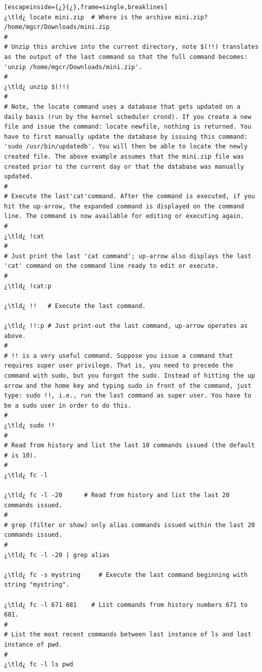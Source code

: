 \begin{lstlisting}[escapeinside={¿}{¿},frame=single,breaklines]
¿\tld¿ locate mini.zip	# Where is the archive mini.zip?
/home/mgcr/Downloads/mini.zip
#
# Unzip this archive into the current directory, note $(!!) translates as the output of the last command so that the full command becomes: 'unzip /home/mgcr/Downloads/mini.zip'.
#
¿\tld¿ unzip $(!!)	
#
# Note, the locate command uses a database that gets updated on a daily basis (run by the kernel scheduler crond). If you create a new file and issue the command: locate newfile, nothing is returned. You have to first manually update the database by issuing this command: 'sudo /usr/bin/updatedb'. You will then be able to locate the newly created file. The above example assumes that the mini.zip file was created prior to the current day or that the database was manually updated.
#
# Execute the last'cat'command. After the command is executed, if you hit the up-arrow, the expanded command is displayed on the command line. The command is now available for editing or executing again.
#
¿\tld¿ !cat
#	
# Just print the last 'cat command'; up-arrow also displays the last 'cat' command on the command line ready to edit or execute.
#
¿\tld¿ !cat:p	

¿\tld¿ !!	# Execute the last command.

¿\tld¿ !!:p	# Just print-out the last command, up-arrow operates as above.
#
# !! is a very useful command. Suppose you issue a command that requires super user privilege. That is, you need to precede the command with sudo, but you forgot the sudo. Instead of hitting the up arrow and the home key and typing sudo in front of the command, just type: sudo !!, i.e., run the last command as super user. You have to be a sudo user in order to do this.
#
¿\tld¿ sudo !!	
#
# Read from history and list the last 10 commands issued (the default # is 10).
#
¿\tld¿ fc -l

¿\tld¿ fc -l -20      # Read from history and list the last 20 commands issued.
#
# grep (filter or show) only alias commands issued within the last 20 commands issued.
#
¿\tld¿ fc -l -20 | grep alias     

¿\tld¿ fc -s mystring     # Execute the last command beginning with string "mystring".

¿\tld¿ fc -l 671 681	# List commands from history numbers 671 to 681.
#
# List the most recent commands between last instance of ls and last instance of pwd.
#
¿\tld¿ fc -l ls pwd	
\end{lstlisting}


